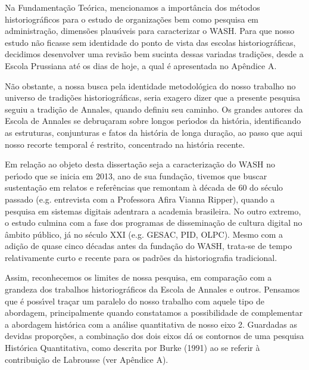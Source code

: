 \documentclass[
12pt,		%
openright,	%
twoside,  %
a4paper,			%
chapter=TITLE,		%
english,			%
french,				%
spanish,			%
brazil				%
]{USPSC-classe/USPSC}
\begin{document}
Na Fundamenta\c{c}\~ao Te\'orica, mencionamos a import\^ancia dos m\'etodos historiogr\'aficos para o estudo de organiza\c{c}\~oes bem como pesquisa em administra\c{c}\~ao, dimens\~oes plaus\'{\i}veis para caracterizar o WASH. Para que nosso estudo n\~ao ficasse sem identidade do ponto de vista das escolas historiogr\'aficas, decidimos desenvolver uma revis\~ao bem sucinta dessas variadas tradi\c{c}\~oes, desde a Escola Prussiana at\'e os dias de hoje, a qual \'e apresentada no Ap\^endice A.








N\~ao obstante, a nossa busca pela identidade metodol\'ogica do nosso trabalho no universo de tradi\c{c}\~oes historiogr\'aficas, seria exagero dizer que a presente pesquisa seguiu a tradi\c{c}\~ao de Annales, quando definiu seu caminho. Os grandes autores da Escola de Annales se debru\c{c}aram sobre longos per\'{\i}odos da hist\'oria, identificando as estruturas, conjunturas e fatos da \textquotedbl hist\'oria de longa dura\c{c}\~ao\textquotedbl , ao passo que aqui nosso recorte temporal \'e restrito, concentrado na hist\'oria recente.








Em rela\c{c}\~ao ao objeto desta disserta\c{c}\~ao seja a caracteriza\c{c}\~ao do WASH no per\'{\i}odo que se inicia em 2013, ano de sua funda\c{c}\~ao, tivemos que buscar sustenta\c{c}\~ao em relatos e refer\^encias que remontam \`a d\'ecada de 60 do s\'eculo passado (e.g. entrevista com a Professora Afira Vianna Ripper), quando a pesquisa em sistemas digitais adentrara a academia brasileira. No outro extremo, o estudo culmina com a fase dos programas de dissemina\c{c}\~ao de cultura digital no \^ambito p\'ublico, j\'a no s\'eculo XXI (e.g. GESAC, PID, OLPC).  Mesmo com a adi\c{c}\~ao de quase cinco d\'ecadas antes da funda\c{c}\~ao do WASH, trata-se de tempo relativamente curto e recente para os padr\~oes da historiografia tradicional.








Assim, reconhecemos os limites de nossa pesquisa, em compara\c{c}\~ao com a grandeza dos trabalhos historiogr\'aficos da Escola de Annales e outros. Pensamos que \'e poss\'{\i}vel tra\c{c}ar um paralelo do nosso trabalho com aquele tipo de abordagem, principalmente quando constatamos a possibilidade de complementar a abordagem hist\'orica com a an\'alise quantitativa de nosso eixo 2. Guardadas as devidas propor\c{c}\~oes, a combina\c{c}\~ao dos dois eixos d\'a os contornos de uma pesquisa Hist\'orica Quantitativa, como descrita por  Burke (1991) ao se referir \`a contribui\c{c}\~ao de Labrousse (ver Ap\^endice A).
\end{document}
